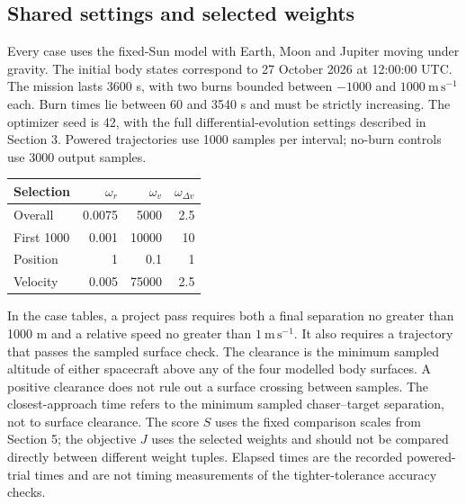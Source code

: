 \subsection{Shared settings and selected weights}
Every case uses the fixed-Sun model with Earth, Moon and Jupiter moving under
gravity. The initial body states correspond to 27 October 2026 at 12:00:00 UTC.
The mission lasts 3600 s, with two burns bounded between
$-1000$ and $1000\ \mathrm{m\,s^{-1}}$ each. Burn times lie between 60 and
3540 s and must be strictly increasing. The optimizer seed is 42, with the
full differential-evolution settings described in Section 3. Powered trajectories
use 1000 samples per interval; no-burn controls use 3000 output samples.
\begin{center}
\begin{tabular}{lrrr}
\toprule
Selection & $\omega_r$ & $\omega_v$ & $\omega_{\Delta v}$\\
\midrule
Overall & 0.0075 & 5000 & 2.5\\
First 1000 & 0.001 & 10000 & 10\\
Position & 1 & 0.1 & 1\\
Velocity & 0.005 & 75000 & 2.5\\
\bottomrule
\end{tabular}
\end{center}
In the case tables, a project pass requires both a final separation no greater
than 1000 m and a relative speed no greater than $1\ \mathrm{m\,s^{-1}}$.
It also requires a trajectory that passes the sampled surface check.
The clearance is the minimum sampled altitude of either spacecraft above
any of the four modelled body surfaces. A positive clearance does not rule
out a surface crossing between samples. The closest-approach time refers
to the minimum sampled chaser--target separation, not to surface clearance.
The score $S$ uses the fixed comparison scales from Section 5; the objective
$J$ uses the selected weights and should not be compared directly between
different weight tuples. Elapsed times are the recorded powered-trial times
and are not timing measurements of the tighter-tolerance accuracy checks.
